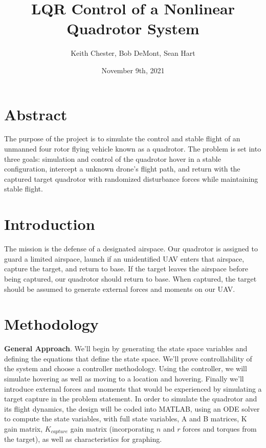 \documentclass{article}
\title{LQR Control of a Nonlinear Quadrotor System}
\author{Keith Chester, Bob DeMont, Sean Hart}
\date{November 9th, 2021}
\begin{document}
\maketitle

\begin{multicols}{2}
\section*{Abstract}
The purpose of the project is to simulate the control and stable flight of an unmanned four rotor flying vehicle known as a quadrotor.  The problem is set into three goals: simulation and control of the quadrotor hover in a stable configuration, intercept a unknown drone's flight path, and return with the captured target quadrotor with randomized disturbance forces while maintaining stable flight.

\section*{Introduction}
The mission is the defense of a designated airspace.  Our quadrotor is assigned to guard a limited airspace, launch if an unidentified UAV enters that airspace, capture the target, and return to base.  If the target leaves the airspace before being captured, our quadrotor should return to base.  When captured, the target should be assumed to generate external forces and moments on our UAV.

\section*{Methodology}
\textbf{General Approach}.  We'll begin by generating the state space variables and defining the equations that define the state space.  We'll prove controllability of the system and choose a controller methodology.  Using the controller, we will simulate hovering as well as moving to a location and hovering. Finally we'll introduce external forces and moments that would be experienced by simulating a target capture in the problem statement. In order to simulate the quadrotor and its flight dynamics, the design will be coded into MATLAB, using an ODE solver to compute the state variables, with full state variables, A and B matrices, K gain matrix, $K_{capture}$ gain matrix (incorporating $n$ and $r$ forces and torques from the target), as well as characteristics for graphing.\\


\end{multicols}
\end{document}
